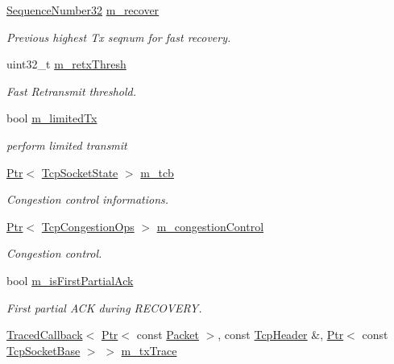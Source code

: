 \begin{DoxyCompactItemize}
\hyperlink{group__network_gacb2070e4e98d2d5135c9bede58f07a03}{Sequence\+Number32} \hyperlink{classns3_1_1TcpSocketBase_a176f84edf4bba543e7e3457881f6660f}{m\+\_\+recover}
\begin{DoxyCompactList}\small\item\em Previous highest Tx seqnum for fast recovery. \end{DoxyCompactList}\item 
uint32\+\_\+t \hyperlink{classns3_1_1TcpSocketBase_aea5678454b966c263c6f72f174e6e328}{m\+\_\+retx\+Thresh}
\begin{DoxyCompactList}\small\item\em Fast Retransmit threshold. \end{DoxyCompactList}\item 
bool \hyperlink{classns3_1_1TcpSocketBase_a676649ad67ed68ec06a1a87a6acd6693}{m\+\_\+limited\+Tx}
\begin{DoxyCompactList}\small\item\em perform limited transmit \end{DoxyCompactList}\item 
\hyperlink{classns3_1_1Ptr}{Ptr}$<$ \hyperlink{classns3_1_1TcpSocketState}{Tcp\+Socket\+State} $>$ \hyperlink{classns3_1_1TcpSocketBase_a26bbaf59001308dc43fb630d76f2e38b}{m\+\_\+tcb}
\begin{DoxyCompactList}\small\item\em Congestion control informations. \end{DoxyCompactList}\item 
\hyperlink{classns3_1_1Ptr}{Ptr}$<$ \hyperlink{classns3_1_1TcpCongestionOps}{Tcp\+Congestion\+Ops} $>$ \hyperlink{classns3_1_1TcpSocketBase_a090719d52b06a791341e2fefa5e12c3e}{m\+\_\+congestion\+Control}
\begin{DoxyCompactList}\small\item\em Congestion control. \end{DoxyCompactList}\item 
bool \hyperlink{classns3_1_1TcpSocketBase_ad68f7d239e22043ba999101b94770d90}{m\+\_\+is\+First\+Partial\+Ack}
\begin{DoxyCompactList}\small\item\em First partial A\+CK during R\+E\+C\+O\+V\+E\+RY. \end{DoxyCompactList}\item 
\hyperlink{classns3_1_1TracedCallback}{Traced\+Callback}$<$ \hyperlink{classns3_1_1Ptr}{Ptr}$<$ const \hyperlink{classns3_1_1Packet}{Packet} $>$, const \hyperlink{classns3_1_1TcpHeader}{Tcp\+Header} \&, \hyperlink{classns3_1_1Ptr}{Ptr}$<$ const \hyperlink{classns3_1_1TcpSocketBase}{Tcp\+Socket\+Base} $>$ $>$ \hyperlink{classns3_1_1TcpSocketBase_a133b5c147fbc16ef12d4788c620cca3c}{m\+\_\+tx\+Trace}

\end{DoxyCompactItemize}
